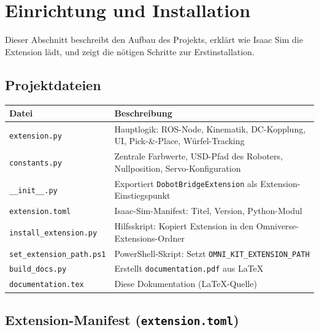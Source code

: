 \documentclass[11pt,a4paper]{article}
\begin{document}
\section{Einrichtung und Installation}
\label{sec:einrichtung}

Dieser Abschnitt beschreibt den Aufbau des Projekts, erklärt wie
Isaac Sim die Extension lädt, und zeigt die nötigen Schritte zur
Erstinstallation.

\subsection{Projektdateien}

\begin{center}
\begin{tabular}{lp{9.5cm}}
  \toprule
  Datei & Beschreibung \\
  \midrule
  \texttt{extension.py}       & Hauptlogik: ROS-Node, Kinematik,
                                DC-Kopplung, UI, Pick-\&-Place, Würfel-Tracking \\
  \texttt{constants.py}       & Zentrale Farbwerte, USD-Pfad des Roboters,
                                Nullposition, Servo-Konfiguration \\
  \texttt{\_\_init\_\_.py}    & Exportiert \texttt{DobotBridgeExtension}
                                als Extension-Einstiegspunkt \\
  \texttt{extension.toml}     & Isaac-Sim-Manifest: Titel, Version, Python-Modul \\
  \texttt{install\_extension.py} & Hilfsskript: Kopiert Extension in den
                                Omniverse-Extensions-Ordner \\
  \texttt{set\_extension\_path.ps1} & PowerShell-Skript: Setzt
                                \texttt{OMNI\_KIT\_EXTENSION\_PATH} \\
  \texttt{build\_docs.py}     & Erstellt \texttt{documentation.pdf} aus LaTeX \\
  \texttt{documentation.tex}  & Diese Dokumentation (LaTeX-Quelle) \\
  \bottomrule
\end{tabular}
\end{center}

\subsection{Extension-Manifest (\texttt{extension.toml})}
\end{document}
